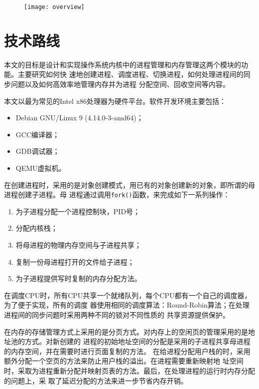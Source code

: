 \documentclass{swfuthesism}
\begin{document}
\begin{figure}
  \centering
  \texttt{[image: overview]}
  \label{fig:overview}
\end{figure}

\section{技术路线}

本文的目标是设计和实现操作系统内核中的进程管理和内存管理这两个模块的功能。主要研究如何快
速地创建进程、调度进程、切换进程，如何处理进程间的同步问题以及如何高效率地管理内存并为进程
分配空间、回收空间等内容。

本文以最为常见的Intel x86处理器为硬件平台。软件开发环境主要包括：
\begin{itemize}
\item Debian GNU/Linux 9 (4.14.0-3-amd64)；
\item GCC编译器；
\item GDB调试器；
\item QEMU虚拟机。
\end{itemize}

在创建进程时，采用的是对象创建模式，用已有的对象创建新的对象，即所谓的母进程创建子进程。母
进程通过调用\texttt{fork()}函数，来完成如下一系列操作：
\begin{enumerate}
\item 为子进程分配一个进程控制块，PID号；
\item 分配内核栈；
\item 将母进程的物理内存空间与子进程共享；
\item 复制一份母进程打开的文件给子进程；
\item 为子进程提供写时复制的内存分配方法。
\end{enumerate}

在调度CPU时，所有CPU共享一个就绪队列，每个CPU都有一个自己的调度器，为了便于实现，所有的调度
器使用相同的调度算法：Round-Robin算法；在处理进程间的同步问题时采用两种不同的锁对不同性质的
共享资源提供保护。

在内存的存储管理方式上采用的是分页方式。对内存上的空闲页的管理采用的是地址池的方式。对新创建的
进程的初始地址空间的分配是采用的子进程共享母进程的内存空间，并在需要时进行页面复制的方法。
在给进程分配用户栈的时，采用额外分配一个空页的方法来防止用户栈的溢出。在进程需要重新映射地
址空间时，采取为进程重新分配并映射页表的方法。最后，在处理进程的运行时内存分配的问题上，采
取了延迟分配的方法来进一步节省内存开销。
\end{document}
